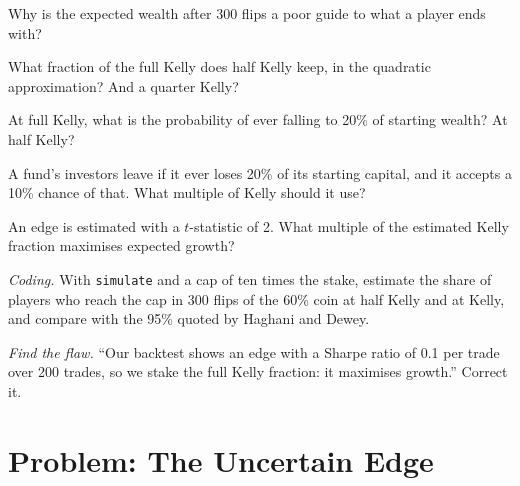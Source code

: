 \begin{exercise}[$\star$]\label{exo:m2:thinking-in-expected-value:2}
Why is the expected wealth after 300 flips a poor guide to what a player ends with?
\end{exercise}

\begin{exercise}[$\star$]\label{exo:m2:thinking-in-expected-value:3}
What fraction of the full Kelly  does half Kelly keep, in the quadratic
approximation? And a quarter Kelly?
\end{exercise}

\begin{exercise}[$\star\star$]\label{exo:m2:thinking-in-expected-value:4}
At full Kelly, what is the probability of ever falling to 20\% of starting wealth? At half
Kelly?
\end{exercise}

\begin{exercise}[$\star\star$]\label{exo:m2:thinking-in-expected-value:5}
A fund's investors leave if it ever loses 20\% of its starting capital, and it accepts a
10\% chance of that. What multiple of Kelly should it use?
\end{exercise}

\begin{exercise}[$\star\star$]\label{exo:m2:thinking-in-expected-value:6}
An edge is estimated with a $t$-statistic of 2. What multiple of the estimated Kelly
fraction maximises expected growth?
\end{exercise}

\begin{exercise}[$\star\star\star$]\label{exo:m2:thinking-in-expected-value:7}
\emph{Coding.} With \texttt{simulate} and a cap of ten times the stake, estimate the share
of players who reach the cap in 300 flips of the 60\% coin at half Kelly and at Kelly,
and compare with the 95\% quoted by Haghani and Dewey.
\end{exercise}

\begin{exercise}[$\star\star\star$]\label{exo:m2:thinking-in-expected-value:8}
\emph{Find the flaw.} ``Our backtest shows an edge with a Sharpe ratio of 0.1 per trade
over 200 trades, so we stake the full Kelly fraction: it maximises growth.'' Correct it.
\end{exercise}

\section{Problem: The Uncertain Edge}

